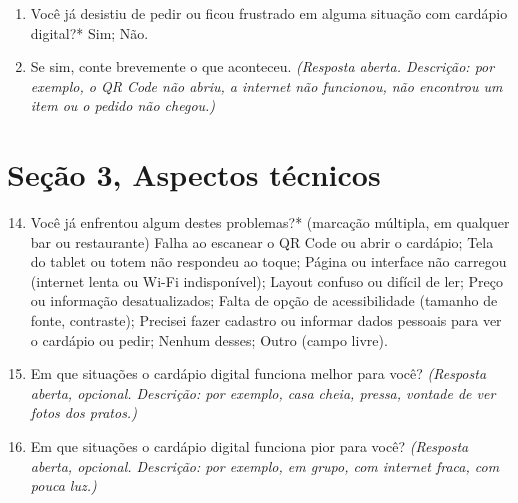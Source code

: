 \begin{enumerate}
	\item Você já desistiu de pedir ou ficou frustrado em alguma situação com cardápio digital?* Sim; Não.
	\item Se sim, conte brevemente o que aconteceu. \emph{(Resposta aberta. Descrição: por exemplo, o QR Code não abriu, a internet não funcionou, não encontrou um item ou o pedido não chegou.)}
\end{enumerate}

\section*{Seção 3, Aspectos técnicos}

\begin{enumerate}\setcounter{enumi}{13}
	\item Você já enfrentou algum destes problemas?* (marcação múltipla, em qualquer bar ou restaurante) Falha ao escanear o QR Code ou abrir o cardápio; Tela do tablet ou totem não respondeu ao toque; Página ou interface não carregou (internet lenta ou Wi-Fi indisponível); Layout confuso ou difícil de ler; Preço ou informação desatualizados; Falta de opção de acessibilidade (tamanho de fonte, contraste); Precisei fazer cadastro ou informar dados pessoais para ver o cardápio ou pedir; Nenhum desses; Outro (campo livre).
	\item Em que situações o cardápio digital funciona melhor para você? \emph{(Resposta aberta, opcional. Descrição: por exemplo, casa cheia, pressa, vontade de ver fotos dos pratos.)}
	\item Em que situações o cardápio digital funciona pior para você? \emph{(Resposta aberta, opcional. Descrição: por exemplo, em grupo, com internet fraca, com pouca luz.)}
\end{enumerate}

